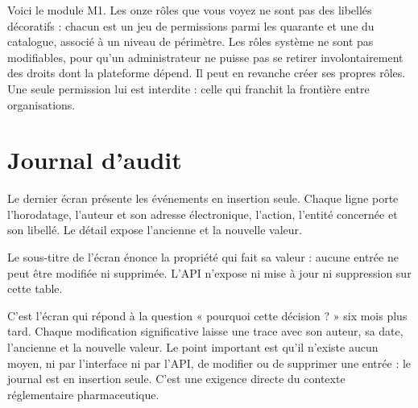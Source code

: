 
\begin{oral}
Voici le module M1. Les onze rôles que vous voyez ne sont pas des libellés décoratifs :
chacun est un jeu de permissions parmi les quarante et une du catalogue, associé à un
niveau de périmètre. Les rôles système ne sont pas modifiables, pour qu'un
administrateur ne puisse pas se retirer involontairement des droits dont la plateforme
dépend. Il peut en revanche créer ses propres rôles. Une seule permission lui est
interdite : celle qui franchit la frontière entre organisations.
\end{oral}

\section{Journal d'audit}

Le dernier écran présente les événements en insertion seule. Chaque ligne porte
l'horodatage, l'auteur et son adresse électronique, l'action, l'entité concernée et son
libellé. Le détail expose l'ancienne et la nouvelle valeur.

Le sous-titre de l'écran énonce la propriété qui fait sa valeur : aucune entrée ne peut
être modifiée ni supprimée. L'API n'expose ni mise à jour ni suppression sur cette
table.


\begin{oral}
C'est l'écran qui répond à la question « pourquoi cette décision ? » six mois plus tard.
Chaque modification significative laisse une trace avec son auteur, sa date, l'ancienne
et la nouvelle valeur. Le point important est qu'il n'existe aucun moyen, ni par
l'interface ni par l'API, de modifier ou de supprimer une entrée : le journal est en
insertion seule. C'est une exigence directe du contexte réglementaire pharmaceutique.
\end{oral}
